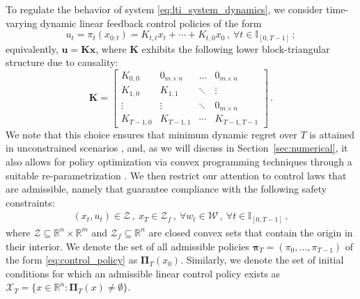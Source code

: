\documentclass[conference]{IEEEtran}
\begin{document}
To regulate the behavior of system \eqref{eq:lti_system_dynamics}, we consider time-varying dynamic linear feedback control policies of the form
\begin{equation}
    \label{eq:control_policy}
    u_t = \pi_t(x_{0:t}) = K_{t,t} x_t + \cdots + K_{t,0} x_0\,, ~ \forall t \in \mathbb{I}_{[0, T-1]}\,;
\end{equation}
equivalently, $\mathbf{u} = \mathbf{K} \mathbf{x}$, where $\mathbf{K}$ exhibits the following lower block-triangular structure due to causality:
\begin{equation*}
    \mathbf{K} =
    \begin{bmatrix}
    	K_{0,0} & 0_{m \times n} & \dots & 0_{m \times n}\\
    	K_{1,0} & K_{1,1} & \ddots & \vdots\\
    	\vdots & \vdots & \ddots & 0_{m \times n}\\
    	K_{T-1, 0} & K_{T-1, 1}& \cdots & K_{T-1, T-1}
    \end{bmatrix}\,.
\end{equation*}
We note that this choice ensures that minimum dynamic regret over $T$ is attained in unconstrained scenarios \cite{goel2023regret, sabag2021regret}, and, as we will discuss in Section~\ref{sec:numerical}, it also allows for policy optimization via convex programming techniques through a suitable re-parametrization \cite{goulart2006optimization, wang2019system}. We then restrict our attention to control laws that are admissible, namely that guarantee compliance with the following safety constraints:
\begin{align}
    \label{eq:safety_constraints}
    (x_t, u_t) \in \mathcal{Z}\,, ~
    x_T \in \mathcal{Z}_f\,, ~ \forall w_t \in \mathcal{W}\,, ~ \forall t \in \mathbb{I}_{[0, T-1]}\,,
\end{align}
where $\mathcal{Z} \subseteq \mathbb{R}^n \times \mathbb{R}^m$ and $\mathcal{Z}_f \subseteq \mathbb{R}^n$ are closed convex sets that contain the origin in their interior. We denote the set of all admissible policies $\bm{\pi}_T = (\pi_0, \dots, \pi_{T-1})$ of the form \eqref{eq:control_policy} as $\bm{\Pi}_T(x_0)$. Similarly, we denote the set of initial conditions for which an admissible linear control policy exists as $\mathcal{X}_T = \{x \in \mathbb{R}^n : \bm{\Pi}_T(x) \neq \emptyset\}$.
\end{document}
